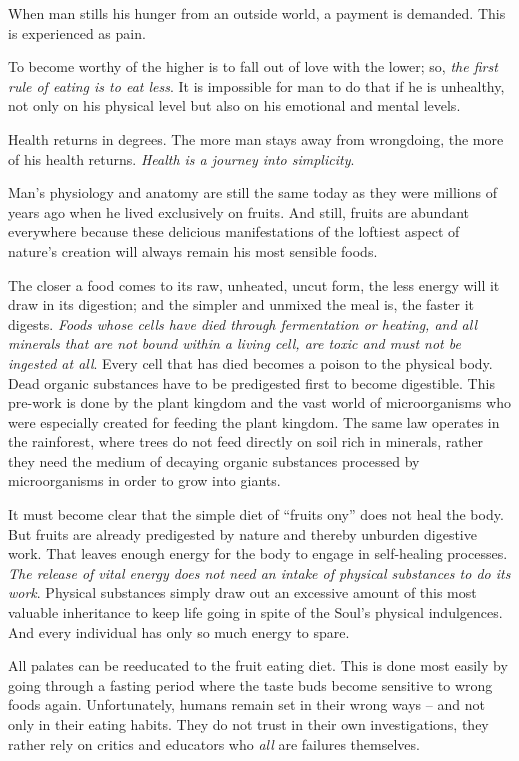 \documentclass[12pt,letterpaper]{article}
\begin{document}
When man stills his hunger from an outside world, a payment is
demanded. This is experienced as pain.

To become worthy of the higher is to fall out of love with the lower;
so, \emph{the first rule of eating is to eat less}. It is impossible
for man to do that if he is unhealthy, not only on his physical level
but also on his emotional and mental levels.

Health returns in degrees. The more man stays away from wrongdoing,
the more of his health returns. \emph{Health is a journey into
simplicity}.

Man's physiology and anatomy are still the same today as they were
millions of years ago when he lived exclusively on fruits. And still,
fruits are abundant everywhere because these delicious manifestations
of the loftiest aspect of nature's creation will always remain his
most sensible foods.

The closer a food comes to its raw, unheated, uncut form, the less
energy will it draw in its digestion; and the simpler and unmixed the
meal is, the faster it digests. \emph{Foods whose cells have died
through fermentation or heating, and all minerals that are not bound
within a living cell, are toxic and must not be ingested at
all}. Every cell that has died becomes a poison to the physical
body. Dead organic substances have to be predigested first to become
digestible. This pre-work is done by the plant kingdom and the vast
world of microorganisms who were especially created for feeding the
plant kingdom. The same law operates in the rainforest, where trees do
not feed directly on soil rich in minerals, rather they need the
medium of decaying organic substances processed by microorganisms in
order to grow into giants.

It must become clear that the simple diet of ``fruits ony'' does not
heal the body. But fruits are already predigested by nature and
thereby unburden digestive work. That leaves enough energy for the
body to engage in self-healing processes. \emph{The release of vital
energy does not need an intake of physical substances to do its
work}. Physical substances simply draw out an excessive amount of this
most valuable inheritance to keep life going in spite of the Soul's
physical indulgences. And every individual has only so much energy to
spare.

All palates can be reeducated to the fruit eating diet. This is done
most easily by going through a fasting period where the taste buds
become sensitive to wrong foods again. Unfortunately, humans remain
set in their wrong ways -- and not only in their eating habits. They
do not trust in their own investigations, they rather rely on critics
and educators who \emph{all} are failures themselves.
\end{document}
